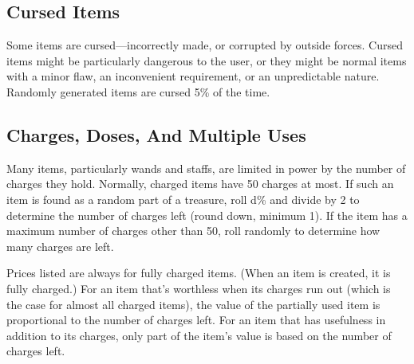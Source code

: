 

\subsection{Cursed Items}
Some items are cursed---incorrectly made, or corrupted by outside forces. Cursed items might be particularly dangerous to the user, or they might be normal items with a minor flaw, an inconvenient requirement, or an unpredictable nature. Randomly generated items are cursed 5\% of the time.

\subsection{Charges, Doses, And Multiple Uses}
Many items, particularly wands and staffs, are limited in power by the number of charges they hold. Normally, charged items have 50 charges at most. If such an item is found as a random part of a treasure, roll d\% and divide by 2 to determine the number of charges left (round down, minimum 1). If the item has a maximum number of charges other than 50, roll randomly to determine how many charges are left.

Prices listed are always for fully charged items. (When an item is created, it is fully charged.) For an item that's worthless when its charges run out (which is the case for almost all charged items), the value of the partially used item is proportional to the number of charges left. For an item that has usefulness in addition to its charges, only part of the item's value is based on the number of charges left.